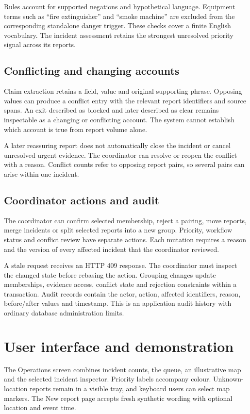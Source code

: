 \documentclass[11pt,a4paper]{article}
\begin{document}
Rules account for supported negations and hypothetical language. Equipment terms such as ``fire extinguisher'' and ``smoke machine'' are excluded from the corresponding standalone danger trigger. These checks cover a finite English vocabulary. The incident assessment retains the strongest unresolved priority signal across its reports.

\subsection{Conflicting and changing accounts}
Claim extraction retains a field, value and original supporting phrase. Opposing values can produce a conflict entry with the relevant report identifiers and source spans. An exit described as blocked and later described as clear remains inspectable as a changing or conflicting account. The system cannot establish which account is true from report volume alone.

A later reassuring report does not automatically close the incident or cancel unresolved urgent evidence. The coordinator can resolve or reopen the conflict with a reason. Conflict counts refer to opposing report pairs, so several pairs can arise within one incident.

\subsection{Coordinator actions and audit}
The coordinator can confirm selected membership, reject a pairing, move reports, merge incidents or split selected reports into a new group. Priority, workflow status and conflict review have separate actions. Each mutation requires a reason and the version of every affected incident that the coordinator reviewed.

A stale request receives an HTTP 409 response. The coordinator must inspect the changed state before rebasing the action. Grouping changes update memberships, evidence access, conflict state and rejection constraints within a transaction. Audit records contain the actor, action, affected identifiers, reason, before/after values and timestamp. This is an application audit history with ordinary database administration limits.

\section{User interface and demonstration}
The Operations screen combines incident counts, the queue, an illustrative map and the selected incident inspector. Priority labels accompany colour. Unknown-location reports remain in a visible tray, and keyboard users can select map markers. The New report page accepts fresh synthetic wording with optional location and event time.
\end{document}
